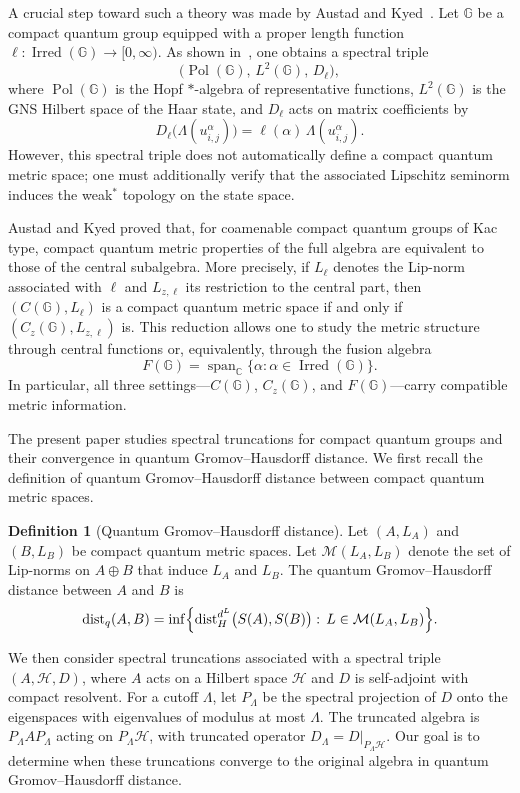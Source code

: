 \documentclass[12pt, reqno]{amsart}
\theoremstyle{definition}
\newtheorem{definition}[theorem]{Definition}
\theoremstyle{remark}
\numberwithin{equation}{section}
\DeclareMathOperator{\Irred}{Irred}
\DeclareMathOperator{\Pol}{Pol}
\begin{document}
A crucial step toward such a theory was made by Austad and Kyed~\cite{16}. Let $\mathbb{G}$ be a compact quantum group equipped with a proper length function $\ell:\Irred(\mathbb{G})\to[0,\infty)$. As shown in~\cite{23}, one obtains a spectral triple
\[
\bigl(\Pol(\mathbb{G}),\, L^{2}(\mathbb{G}),\, D_{\ell}\bigr),
\]
where $\Pol(\mathbb{G})$ is the Hopf $*$-algebra of representative functions, $L^{2}(\mathbb{G})$ is the GNS Hilbert space of the Haar state, and $D_{\ell}$ acts on matrix coefficients by
\[
D_{\ell}\bigl(\Lambda(u_{i,j}^{\alpha})\bigr)=\ell(\alpha)\,\Lambda(u_{i,j}^{\alpha}).
\]
However, this spectral triple does not automatically define a compact quantum metric space; one must additionally verify that the associated Lipschitz seminorm induces the weak$^{*}$ topology on the state space.

Austad and Kyed proved that, for coamenable compact quantum groups of Kac type, compact quantum metric properties of the full algebra are equivalent to those of the central subalgebra. More precisely, if $L_{\ell}$ denotes the Lip-norm associated with $\ell$ and $L_{z,\ell}$ its restriction to the central part, then $(C(\mathbb{G}),L_{\ell})$ is a compact quantum metric space if and only if $(C_{z}(\mathbb{G}),L_{z,\ell})$ is. This reduction allows one to study the metric structure through central functions or, equivalently, through the fusion algebra
\[
F(\mathbb{G})=\operatorname{span}_{\mathbb{C}}\{\alpha:\alpha\in\Irred(\mathbb{G})\}.
\]
In particular, all three settings---$C(\mathbb{G})$, $C_{z}(\mathbb{G})$, and $F(\mathbb{G})$---carry compatible metric information.

The present paper studies spectral truncations for compact quantum groups and their convergence in quantum Gromov--Hausdorff distance. We first recall the definition of quantum Gromov--Hausdorff distance between compact quantum metric spaces.

\begin{definition}[Quantum Gromov--Hausdorff distance]
Let $(A,L_{A})$ and $(B,L_{B})$ be compact quantum metric spaces. Let $\mathcal{M}(L_{A},L_{B})$ denote the set of Lip-norms on $A\oplus B$ that induce $L_{A}$ and $L_{B}$. The quantum Gromov--Hausdorff distance between $A$ and $B$ is
\[
\operatorname{dist}_{q}(A,B)
=
\inf\Bigl\{
\operatorname{dist}_{H}^{d^{L}}\bigl(S(A),S(B)\bigr)
:\, L\in\mathcal{M}(L_{A},L_{B})
\Bigr\}.
\]
\end{definition}

We then consider spectral truncations associated with a spectral triple $(A,\mathcal{H},D)$, where $A$ acts on a Hilbert space $\mathcal{H}$ and $D$ is self-adjoint with compact resolvent. For a cutoff $\Lambda$, let $P_{\Lambda}$ be the spectral projection of $D$ onto the eigenspaces with eigenvalues of modulus at most $\Lambda$. The truncated algebra is $P_{\Lambda}AP_{\Lambda}$ acting on $P_{\Lambda}\mathcal{H}$, with truncated operator $D_{\Lambda}=D|_{P_{\Lambda}\mathcal{H}}$. Our goal is to determine when these truncations converge to the original algebra in quantum Gromov--Hausdorff distance.
\end{document}
